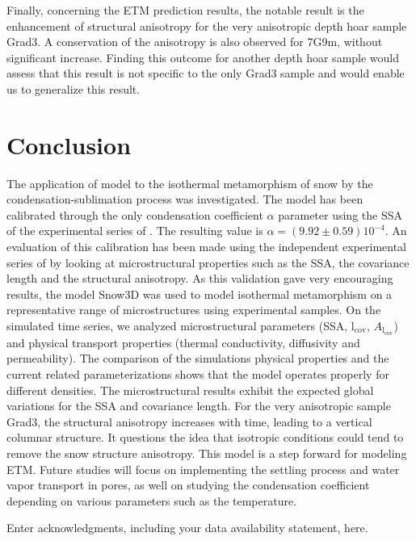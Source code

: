 \documentclass[draft,ms]{agujournal2019}
\begin{document}
Finally, concerning the ETM prediction results, the notable result is the enhancement of structural anisotropy for the very anisotropic depth hoar sample Grad3. A conservation of the anisotropy is also observed for 7G9m, without significant increase. Finding this outcome for another depth hoar sample would assess that this result is not specific to the only Grad3 sample and would enable us to generalize this result.

\section{Conclusion}

The application of  model to the isothermal metamorphism of snow by the condensation-sublimation process was investigated. The model has been calibrated through the only condensation coefficient $\alpha$ parameter using the SSA of the experimental series of \cite{flin_three-dimensional_2004}. The resulting value is $\alpha = ( 9.92 \pm 0.59) 10^{-4}$. An evaluation of this calibration has been made using the independent experimental series of \cite{hagenmuller_motion_2019} by looking at microstructural properties such as the SSA, the covariance length and the structural anisotropy. As this validation gave very encouraging results, the model Snow3D was used to model isothermal metamorphism on a representative range of microstructures using experimental samples. On the simulated time series, we analyzed microstructural parameters (SSA, $\mathrm{l_{cov}}$, $A_{\mathrm{l_{cov}}}$) and physical transport properties (thermal conductivity, diffusivity and permeability). The comparison of the simulations physical properties and the current related parameterizations shows that the model operates properly for different densities. The microstructural results exhibit the expected global variations for the SSA and covariance length. For the very anisotropic sample Grad3, the structural anisotropy increases with time, leading to a vertical columnar structure. It questions the idea that isotropic conditions could tend to remove the snow structure anisotropy. This model is a step forward for modeling ETM. Future studies will focus on implementing the settling process and water vapor transport in pores, as well on studying the condensation coefficient depending on various parameters such as the temperature.  


\acknowledgments
Enter acknowledgments, including your data availability statement, here.


\end{document}
